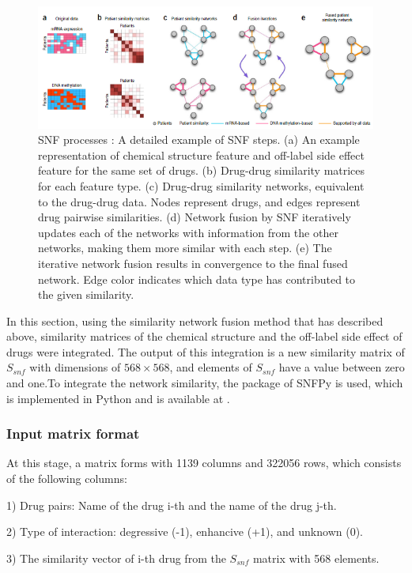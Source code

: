 \documentclass{bmcart}
\begin{document}
\begin{figure}[!h]
	\centering
	\includegraphics[scale=.53]{SNF.png}
	\caption{SNF processes \cite{wang2014similarity}:
	A detailed example of SNF steps. (a) An example representation of chemical structure feature and off-label side effect feature for the same set of drugs. (b) Drug-drug similarity matrices for each feature type. (c) Drug-drug similarity networks, equivalent to the drug-drug data. Nodes represent drugs, and edges represent drug pairwise similarities. (d) Network fusion by SNF iteratively updates each of the networks with information from the other networks, making them more similar with each step. (e) The iterative network fusion results in convergence to the final fused network. Edge color indicates which data type has contributed to the given similarity. }
	\label{SNF}
\end{figure}

In this section, using the similarity network fusion method that has described above, similarity matrices of the chemical structure and the off-label side effect of drugs were integrated. The output of this integration is a new similarity matrix of $S_{snf}$ with dimensions of $568 \times 568$, and elements of $S_{snf}$ have a value between zero and one.To integrate the network similarity, the package of SNFPy is used, which is implemented in Python and is available at \cite{SNFPy2020}.

\subsubsection*{Input matrix format}

At this stage, a matrix forms with 1139 columns and 322056 rows, which consists of the following columns:

1) Drug pairs: Name of the drug i-th and the name of the drug j-th.

2) Type of interaction: degressive (-1), enhancive (+1), and unknown (0).

3) The similarity vector of i-th drug from the $S_{snf}$ matrix with 568 elements.
\end{document}
